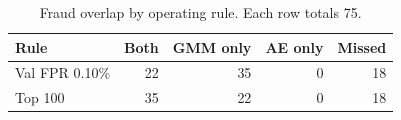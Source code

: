 \begin{table}[H]
\centering\footnotesize\setlength{\tabcolsep}{3pt}
\caption{Fraud overlap by operating rule. Each row totals 75.}
\label{tab:overlap}
\begin{tabular}{@{}lrrrr@{}}
\toprule
Rule & Both & GMM only & AE only & Missed \\
\midrule
Val FPR 0.10\% & 22 & 35 & 0 & 18 \\
Top 100 & 35 & 22 & 0 & 18 \\
\bottomrule
\end{tabular}
\end{table}
